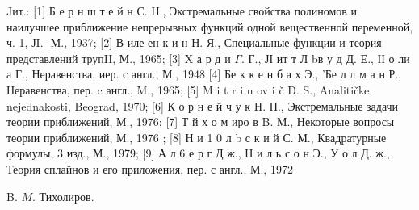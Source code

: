 \documentclass[10pt]{article}
\begin{document}
Jит.: [1] Б е р н ш т е й н С. Н., Экстремальные свойства полиномов и наилучшее приближение непрерывных функций одной вещественной переменной, ч. 1, ЈI.- М., 1937; [2] В иле ен к и н Н. Я., Специальные функции и теория представлений трупII, М., 1965; [3] X а р д и $\Gamma$. Г., ЈІ ит т Л bв у д Д. Е., ІІ о ли а Г., Неравенства, иер. с англ., М., 1948 [4] Бе к к е н б а х Э., 'Бе л л м а н Р., Неравенства, пер. c англ., M., 1965; [5] M i t r i n ov i č D. S., Analitičke nejednakosti, Beograd, 1970; [6] К о р н е й ч у к H. П., Экстремальные задачи теории приближений, М., 1976; [7] Т й х о м иро в B. М., Некоторые вопросы теории приближений, М., 1976 ; [8] Н и 1 0 л b с к и й С. М., Квадратурные формулы, 3 изд., М., 1979; [9] А л 6 е р г Д ж., Н и л ь с о н Э., У о л Д. ж., Теория сплайнов и его приложения, пер. с англ., М., 1972



B. $M$. Тихолиров.
\end{document}
